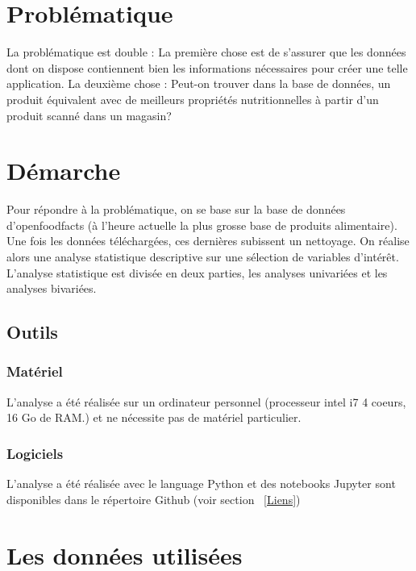 \section{Problématique}

La problématique est double :\newline
La première chose est de s'assurer que les données dont on dispose contiennent
bien les informations nécessaires pour créer une telle application.\newline
La deuxième chose :\newline
Peut-on trouver dans la base de données, un produit équivalent avec
de meilleurs propriétés nutritionnelles à partir d'un produit scanné dans
un magasin?

\section{Démarche}

  Pour répondre à la problématique, on se base sur la base de données
  d'openfoodfacts (à l'heure actuelle la plus grosse base de produits alimentaire).
  Une fois les données téléchargées, ces dernières subissent un nettoyage.
  On réalise alors une analyse statistique descriptive
  sur une sélection de variables d'intérêt.
  L'analyse statistique est divisée en deux parties, les analyses univariées et
  les analyses bivariées.

  \subsection{Outils}

    \subsubsection{Matériel}

    L'analyse a été réalisée sur un ordinateur personnel
    (processeur intel i7 4 coeurs, 16 Go de RAM.) et ne nécessite pas de
    matériel particulier.

    \subsubsection{Logiciels}

    L'analyse a été réalisée avec le language Python et des notebooks Jupyter
    sont disponibles dans le répertoire Github (voir section ~\ref{Liens})

\section{Les données utilisées}

